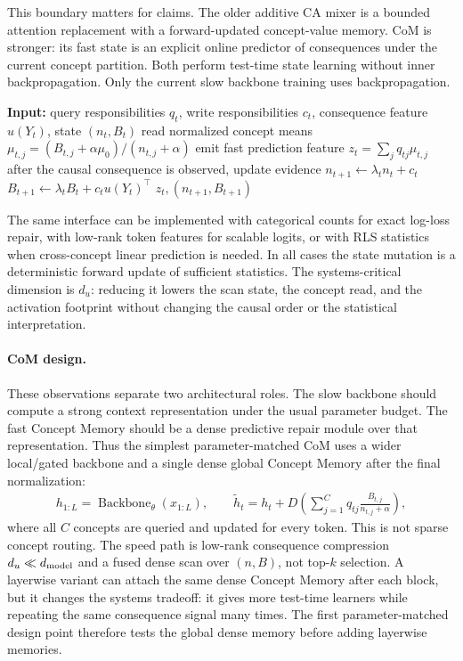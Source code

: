 This boundary matters for claims. The older additive CA mixer is a bounded attention replacement with a forward-updated concept-value memory. CoM is stronger: its fast state is an explicit online predictor of consequences under the current concept partition. Both perform test-time state learning without inner backpropagation. Only the current slow backbone training uses backpropagation.

\begin{algorithm}[H]
\caption{\textsc{ConceptMemoryStep}}
\label{alg:concept-memory}
\begin{algorithmic}[1]
\State \textbf{Input:} query responsibilities $q_t$, write responsibilities $c_t$, consequence feature $u(Y_t)$, state $(n_t,B_t)$
\State read normalized concept means $\mu_{t,j}=(B_{t,j}+\alpha\mu_0)/(n_{t,j}+\alpha)$
\State emit fast prediction feature $z_t=\sum_j q_{tj}\mu_{t,j}$
\State after the causal consequence is observed, update evidence
\State $n_{t+1}\leftarrow \lambda_t n_t+c_t$
\State $B_{t+1}\leftarrow \lambda_t B_t+c_tu(Y_t)^\top$
\State \Return $z_t,(n_{t+1},B_{t+1})$
\end{algorithmic}
\end{algorithm}

The same interface can be implemented with categorical counts for exact log-loss repair, with low-rank token features for scalable logits, or with RLS statistics when cross-concept linear prediction is needed. In all cases the state mutation is a deterministic forward update of sufficient statistics. The systems-critical dimension is $d_u$: reducing it lowers the scan state, the concept read, and the activation footprint without changing the causal order or the statistical interpretation.

\paragraph{CoM design.}
These observations separate two architectural roles. The slow backbone should compute a strong context representation under the usual parameter budget. The fast Concept Memory should be a dense predictive repair module over that representation. Thus the simplest parameter-matched CoM uses a wider local/gated backbone and a single dense global Concept Memory after the final normalization:
\begin{align*}
h_{1:L}=\operatorname{Backbone}_\theta(x_{1:L}),
\qquad
\tilde h_t=h_t+D\!\left(\sum_{j=1}^C q_{tj}\frac{B_{t,j}}{n_{t,j}+\alpha}\right),
\end{align*}
where all $C$ concepts are queried and updated for every token. This is not sparse concept routing. The speed path is low-rank consequence compression $d_u\ll d_{\rm model}$ and a fused dense scan over $(n,B)$, not top-$k$ selection. A layerwise variant can attach the same dense Concept Memory after each block, but it changes the systems tradeoff: it gives more test-time learners while repeating the same consequence signal many times. The first parameter-matched design point therefore tests the global dense memory before adding layerwise memories.

